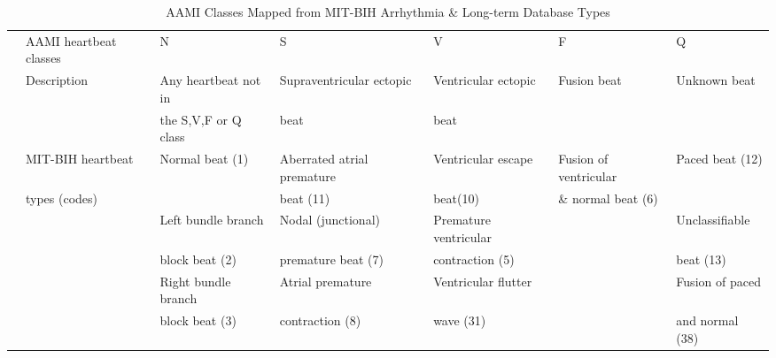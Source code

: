 \documentclass{bmcart}
\begin{document}
 
 


\begin{sidewaystable}
 \caption{AAMI Classes Mapped from MIT-BIH Arrhythmia \& Long-term Database Types}
\label{Table1}

\begin{center}
\begin{threeparttable}

\begin{tabular}{cllllll}
\hline
& AAMI heartbeat classes & N & S & V & F & Q \\
& Description  &Any heartbeat not in & Supraventricular ectopic  & Ventricular ectopic  & Fusion beat & Unknown beat \\
&                     &the S,V,F or Q class & beat   		     & beat	      &	     &          \\
\hline
& MIT-BIH heartbeat  &Normal beat (1)            & Aberrated atrial premature & Ventricular escape & Fusion of ventricular& Paced beat (12)\\
&  types (codes)   &  					  &  beat (11)		    &  beat(10)	            & \& normal beat (6)		      &             \\

&                     &Left bundle branch   &  Nodal (junctional) &Premature ventricular& 	 &  Unclassifiable \\
&                     &block beat (2)            & premature beat (7)    &contraction (5)         &	   & beat (13)   \\

&                     & Right bundle branch & Atrial premature & Ventricular flutter &    &  Fusion of paced  \\
&                     & block beat (3) & contraction (8)     & wave (31) & 	   & and normal (38)  \\


\end{tabular}
\end{threeparttable}
\end{center}
\end{sidewaystable}
\end{document}
